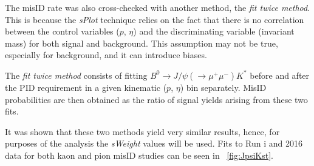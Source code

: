 \color{black}

The misID rate was also cross-checked with another method, the \textit{fit twice method}. This is because the \textit{sPlot} technique relies on the fact that there is no correlation between the control variables ($p$, $\eta$) and the discriminating variable (invariant mass) for both signal and background. This assumption may not be true, especially for background, and it can introduce biases.

The \textit{fit twice method} consists of fitting $B^{0} \rightarrow J/\psi(\rightarrow \mu^{+} \mu^{-}) K^{*}$ before and after the \gls{PID} requirement in a given kinematic ($p$, $\eta$) bin separately. MisID probabilities are then obtained as the ratio of signal yields arising from these two fits.


It was shown that these two methods yield very similar results, hence,
for purposes of the \Bmumumu analysis the \textit{sWeight} values will be used. Fits to Run \Rn{1} and 2016 data for both kaon and pion misID studies can be seen in ~\autoref{fig:JpsiKst}.

